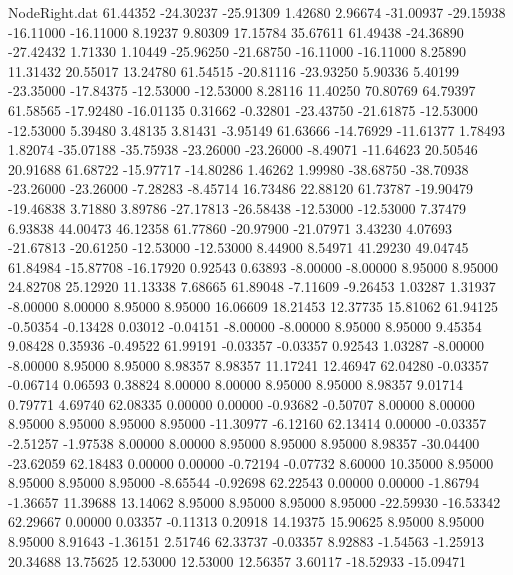 \begin{filecontents}{NodeRight.dat}
  61.44352  -24.30237  -25.91309     1.42680    2.96674  -31.00937  -29.15938  -16.11000  -16.11000    8.19237    9.80309   17.15784   35.67611
  61.49438  -24.36890  -27.42432     1.71330    1.10449  -25.96250  -21.68750  -16.11000  -16.11000    8.25890   11.31432   20.55017   13.24780
  61.54515  -20.81116  -23.93250     5.90336    5.40199  -23.35000  -17.84375  -12.53000  -12.53000    8.28116   11.40250   70.80769   64.79397
  61.58565  -17.92480  -16.01135     0.31662   -0.32801  -23.43750  -21.61875  -12.53000  -12.53000    5.39480    3.48135    3.81431   -3.95149
  61.63666  -14.76929  -11.61377     1.78493    1.82074  -35.07188  -35.75938  -23.26000  -23.26000   -8.49071  -11.64623   20.50546   20.91688
  61.68722  -15.97717  -14.80286     1.46262    1.99980  -38.68750  -38.70938  -23.26000  -23.26000   -7.28283   -8.45714   16.73486   22.88120
  61.73787  -19.90479  -19.46838     3.71880    3.89786  -27.17813  -26.58438  -12.53000  -12.53000    7.37479    6.93838   44.00473   46.12358
  61.77860  -20.97900  -21.07971     3.43230    4.07693  -21.67813  -20.61250  -12.53000  -12.53000    8.44900    8.54971   41.29230   49.04745
  61.84984  -15.87708  -16.17920     0.92543    0.63893   -8.00000   -8.00000    8.95000    8.95000   24.82708   25.12920   11.13338    7.68665
  61.89048   -7.11609   -9.26453     1.03287    1.31937   -8.00000    8.00000    8.95000    8.95000   16.06609   18.21453   12.37735   15.81062
  61.94125   -0.50354   -0.13428     0.03012   -0.04151   -8.00000   -8.00000    8.95000    8.95000    9.45354    9.08428    0.35936   -0.49522
  61.99191   -0.03357   -0.03357     0.92543    1.03287   -8.00000   -8.00000    8.95000    8.95000    8.98357    8.98357   11.17241   12.46947
  62.04280   -0.03357   -0.06714     0.06593    0.38824    8.00000    8.00000    8.95000    8.95000    8.98357    9.01714    0.79771    4.69740
  62.08335    0.00000    0.00000    -0.93682   -0.50707    8.00000    8.00000    8.95000    8.95000    8.95000    8.95000  -11.30977   -6.12160
  62.13414    0.00000   -0.03357    -2.51257   -1.97538    8.00000    8.00000    8.95000    8.95000    8.95000    8.98357  -30.04400  -23.62059
  62.18483    0.00000    0.00000    -0.72194   -0.07732    8.60000   10.35000    8.95000    8.95000    8.95000    8.95000   -8.65544   -0.92698
  62.22543    0.00000    0.00000    -1.86794   -1.36657   11.39688   13.14062    8.95000    8.95000    8.95000    8.95000  -22.59930  -16.53342
  62.29667    0.00000    0.03357    -0.11313    0.20918   14.19375   15.90625    8.95000    8.95000    8.95000    8.91643   -1.36151    2.51746
  62.33737   -0.03357    8.92883    -1.54563   -1.25913   20.34688   13.75625   12.53000   12.53000   12.56357    3.60117  -18.52933  -15.09471

\end{filecontents}
